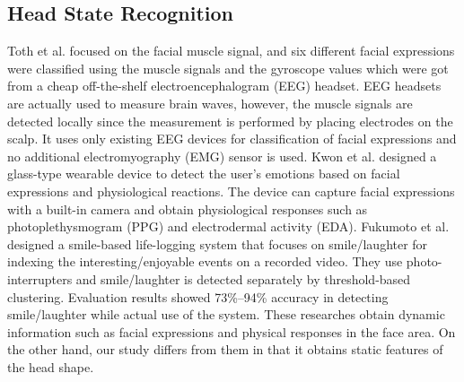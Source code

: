 \documentclass[sigchi,authordraft]{acmart}
\begin{document}
\subsection{Head State Recognition}
Toth et al.\cite{facial_expression_headset} focused on the facial muscle signal, and six different facial expressions were classified using the muscle signals and the gyroscope values which were got from a cheap off-the-shelf electroencephalogram (EEG) headset. EEG headsets are actually used to measure brain waves, however, the muscle signals are detected locally since the measurement is performed by placing electrodes on the scalp. It uses only existing EEG devices for classification of facial expressions and no additional electromyography (EMG) sensor is used.
Kwon et al.\cite{facial_expression_glasses} designed a glass-type wearable device to detect the user's emotions based on facial expressions and physiological reactions. The device can capture facial expressions with a built-in camera and obtain physiological responses such as photoplethysmogram (PPG) and electrodermal activity (EDA).
Fukumoto et al.\cite{fukumoto} designed a smile-based life-logging system that focuses on smile/laughter for indexing the interesting/enjoyable events on a recorded video. They use photo-interrupters and smile/laughter is detected separately by threshold-based clustering. Evaluation results showed 73\%--94\% accuracy in detecting smile/laughter while actual use of the system.
These researches obtain dynamic information such as facial expressions and physical responses in the face area. On the other hand, our study differs from them in that it obtains static features of the head shape.\par
\end{document}
